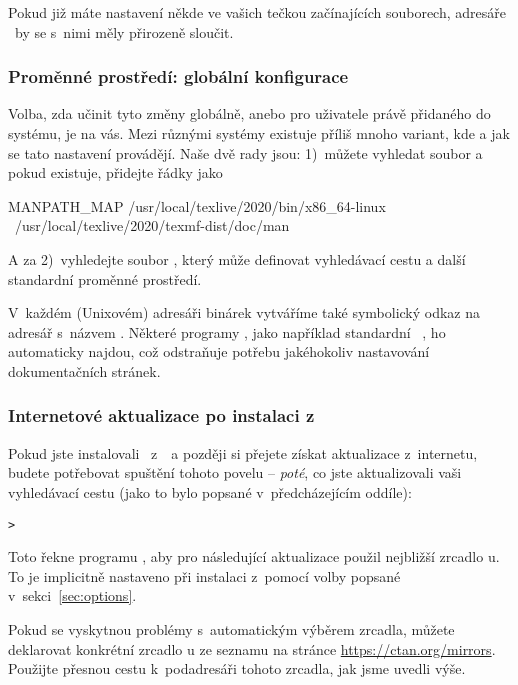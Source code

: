 \documentclass[\classoptions,slovak,english,czech]{\classname}
\begin{document}
Pokud již máte nastavení někde ve vašich tečkou začínajících souborech, 
adresáře \TL\ by se s~nimi měly přirozeně sloučit.


\subsubsection{Proměnné prostředí: globální konfigurace}
\label{sec:envglobal}
Volba, zda učinit tyto změny globálně, anebo pro uživatele právě
přidaného do systému, je na vás. Mezi různými systémy existuje 
příliš mnoho variant, kde a jak se tato nastavení provádějí.
Naše dvě rady jsou: 1)~můžete vyhledat soubor
 a pokud existuje, přidejte řádky jako

\begin{sverbatim}
MANPATH_MAP /usr/local/texlive/2020/bin/x86_64-linux \
            /usr/local/texlive/2020/texmf-dist/doc/man
\end{sverbatim}

A za 2)~vyhledejte soubor ,
který může definovat vyhledávací cestu a další standardní 
proměnné prostředí.

V~každém (Unixovém) adresáři binárek vytváříme také symbolický 
odkaz na adresář  s~názvem .
Některé programy , jako například standardní
\MacOSX\ \code{man}, ho automaticky najdou, což odstraňuje
potřebu jakéhokoliv nastavování dokumentačních stránek.

\subsubsection{Internetové aktualizace po instalaci z~\protect\DVD}
\label{sec:dvd-install-net-updates}

Pokud jste instalovali \TL\ z~\DVD\ a později si přejete
získat aktualizace z~internetu, budete potřebovat spuštění
tohoto povelu -- \emph{poté}, co jste aktualizovali vaši
vyhledávací cestu (jako to bylo popsané v~předcházejícím oddíle):

\begin{alltt}
> 
\end{alltt}

Toto řekne programu , aby pro následující
aktualizace použil nejbližší zrcadlo \CTAN{}u.
To je implicitně nastaveno při instalaci
z~\DVD pomocí volby popsané v~sekci~\ref{sec:options}. 

Pokud se vyskytnou problémy s~automatickým výběrem zrcadla, 
můžete deklarovat konkrétní zrcadlo \CTAN{}u ze seznamu na stránce
\url{https://ctan.org/mirrors}. Použijte přesnou cestu k~podadresáři 
\dirname{tlnet} tohoto zrcadla, jak jsme uvedli výše.
\end{document}
